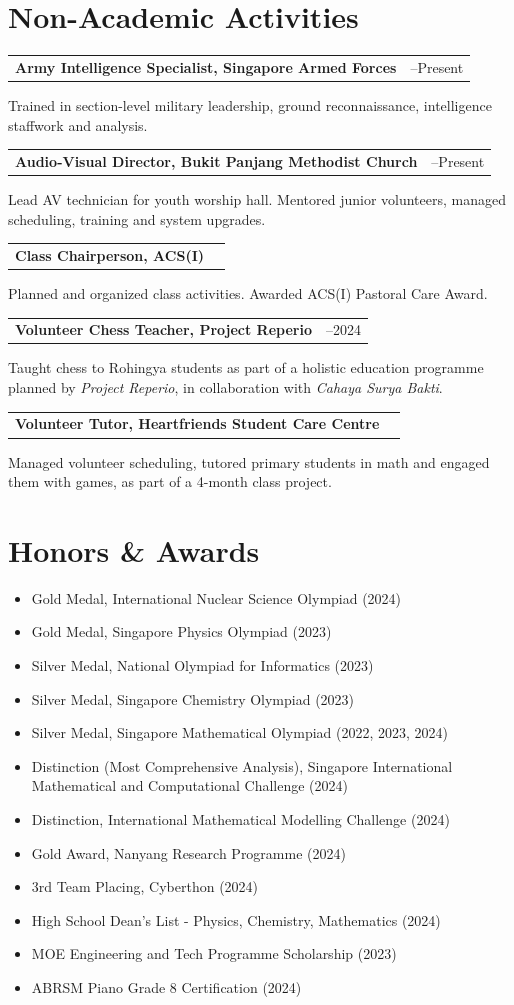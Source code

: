 \documentclass[11pt,a4paper]{article}
\makeatletter
\newcommand{\indentedsection}[2]{
  \section*{#1}
  \vspace{-4pt}
  \hspace{1.5em}
  \begin{minipage}{\dimexpr\textwidth-1.5em}
    #2
  \end{minipage}
}
\newcommand{\entry}[3]{
  \begin{minipage}{\textwidth}
    \noindent
    \begin{tabularx}{\textwidth}{@{}>{\bfseries}X@{\hspace{5em}}>{\raggedleft\arraybackslash}p{3cm}@{}}
      #1 & #2 \\
    \end{tabularx}
    \par\vspace{0.1em} %
    \begin{minipage}[t]{\dimexpr\textwidth - 9em\relax}
      \setlength{\parskip}{0.4em} %
      #3
    \end{minipage}
    \vspace{10pt}
  \end{minipage}
  
}
\makeatother
\begin{document}
\indentedsection{Non-Academic Activities}{
  \entry{Army Intelligence Specialist, Singapore Armed Forces}{2025--Present}
  {Trained in section-level military leadership, ground reconnaissance, intelligence staffwork and analysis.} 

  \entry{Audio-Visual Director, Bukit Panjang Methodist Church}{2024--Present}
  {Lead AV technician for youth worship hall. Mentored junior volunteers, managed scheduling, training and system upgrades.} 
  
  \entry{Class Chairperson, ACS(I)}{2024}
  {Planned and organized class activities. Awarded ACS(I) Pastoral Care Award.} 
  
  \entry{Volunteer Chess Teacher, Project Reperio}{2023--2024}
  {Taught chess to Rohingya students as part of a holistic education programme planned by \textit{Project Reperio}, in collaboration with \textit{Cahaya Surya Bakti}.} 
  
  \entry{Volunteer Tutor, Heartfriends Student Care Centre}{2023}
  {Managed volunteer scheduling, tutored primary students in math and engaged them with games, as part of a 4-month class project.} 
}

\indentedsection{Honors \& Awards}{
  \begin{itemize}[leftmargin=1em]
    \setlength\itemsep{2pt}
    \item Gold Medal, International Nuclear Science Olympiad (2024)
    \item Gold Medal, Singapore Physics Olympiad (2023)
    \item Silver Medal, National Olympiad for Informatics (2023)
    \item Silver Medal, Singapore Chemistry Olympiad (2023)
    \item Silver Medal, Singapore Mathematical Olympiad (2022, 2023, 2024)
    \item Distinction (Most Comprehensive Analysis), Singapore International Mathematical and Computational Challenge (2024)
    \item Distinction, International Mathematical Modelling Challenge (2024)
    \item Gold Award, Nanyang Research Programme (2024)
    \item 3rd Team Placing, Cyberthon (2024)
    \item High School Dean's List - Physics, Chemistry, Mathematics (2024)
    \item MOE Engineering and Tech Programme Scholarship (2023)
    \item ABRSM Piano Grade 8 Certification (2024)
  \end{itemize}
  \vspace{5pt}
}
\end{document}
